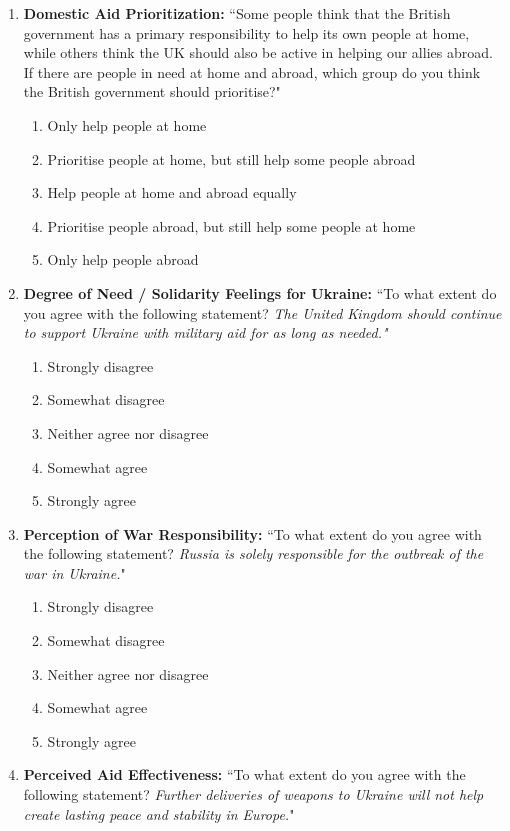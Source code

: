 \begin{appendices}
\begin{enumerate}
\begin{enumerate}
    \end{enumerate}
\textbf{RANDOMIZE ORDER OF QUESTIONS 9-14}
    \item \textbf{Domestic Aid Prioritization:}  ``Some people think that the British government has a primary responsibility to help its own people at home, while others think the UK should also be active in helping our allies abroad. If there are people in need at home and abroad, which group do you think the British government should prioritise?" 
    \begin{enumerate}
        \item Only help people at home
        \item Prioritise people at home, but still help some people abroad
        \item Help people at home and abroad equally
        \item Prioritise people abroad, but still help some people at home 
        \item Only help people abroad 
    \end{enumerate}
    \item \textbf{\textbf{Degree of Need / Solidarity Feelings for Ukraine:}} ``To what extent do you agree with the following statement? \textit{The United Kingdom should continue to support Ukraine with military aid for as long as needed."}
    \begin{enumerate}
        \item Strongly disagree
        \item Somewhat disagree
        \item Neither agree nor disagree
        \item Somewhat agree
        \item Strongly agree
    \end{enumerate}
    \item \textbf{Perception of War Responsibility:} ``To what extent do you agree with the following statement? \textit{Russia is solely responsible for the outbreak of the war in Ukraine.}"
    \begin{enumerate}
        \item Strongly disagree
        \item Somewhat disagree
        \item Neither agree nor disagree
        \item Somewhat agree
        \item Strongly agree
    \end{enumerate}
    \item \textbf{Perceived Aid Effectiveness:} ``To what extent do you agree with the following statement? \textit{Further deliveries of weapons to Ukraine will not help create lasting peace and stability in Europe.}"

\end{enumerate}
\end{appendices}
